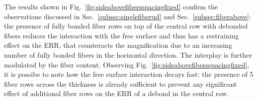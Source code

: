 \documentclass[review]{elsarticle}
\begin{document}
The results shown in Fig.~\ref{fig:sideabovefibersspacingfixed} confirm the observations discussed in Sec.~\ref{subsec:singlefiberud} and Sec.~\ref{subsec:fiberabove}: the presence of fully bonded fiber rows on top of the central row with debonded fibers reduces the interaction with the free surface and thus has a restraining effect on the ERR, that counteracts the magnification due to an increasing number of fully bonded fibers in the horizontal direction. The interplay is further modulated by the fiber content. Observing Fig.~\ref{fig:sideabovefibersspacingfixed}, it is possibe to note how the free surface interaction decays fast: the presence of 5 fiber rows across the thickness is already sufficient to prevent any significant effect of additional fiber rows on the ERR of a debond in the central row.

\end{document}
